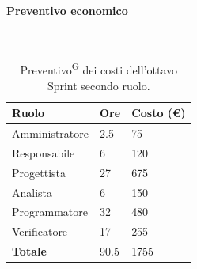 \documentclass[8pt]{article}
\newcommand{\glossterm}[1]{#1\textsuperscript{G}} %
\newcommand{\subsubsubsection}[1]{\paragraph{#1}\mbox{}\\}
\begin{document}
\subsubsubsection{Preventivo economico}
    \begin{table}[ht!]
	\centering
	\begin{tabular}{p{4cm} p{1cm} p{2cm}}
        \toprule
        \textbf{Ruolo} & \textbf{Ore} & \textbf{Costo (€)} \\
        \midrule
        Amministratore & 2.5  & 75   \\
        Responsabile   & 6  & 120 \\
        Progettista    & 27 & 675 \\
        Analista       & 6 & 150 \\
        Programmatore  & 32 & 480 \\
        Verificatore   & 17 & 255 \\
        \bottomrule
        \textbf{Totale} & 90.5 & 1755
    \end{tabular}
    \caption{\glossterm{Preventivo} dei costi dell'ottavo Sprint secondo ruolo.}
	\label{table:Preventivo dei costi dell'ottavo Sprint secondo ruolo}
\end{table}
\end{document}
